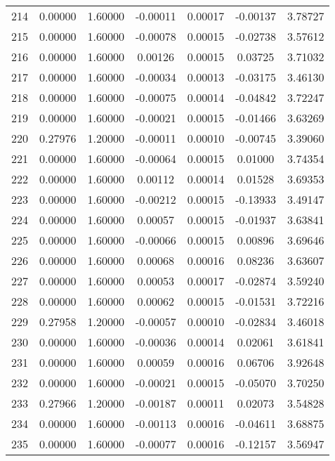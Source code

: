 \begin{longtable}{c c c c c c c}
214 &  0.00000 &      1.60000 & -0.00011 &   0.00017 &  -0.00137 &   3.78727 \\
215 &  0.00000 &      1.60000 & -0.00078 &   0.00015 &  -0.02738 &   3.57612 \\
216 &  0.00000 &      1.60000 &  0.00126 &   0.00015 &   0.03725 &   3.71032 \\
217 &  0.00000 &      1.60000 & -0.00034 &   0.00013 &  -0.03175 &   3.46130 \\
218 &  0.00000 &      1.60000 & -0.00075 &   0.00014 &  -0.04842 &   3.72247 \\
219 &  0.00000 &      1.60000 & -0.00021 &   0.00015 &  -0.01466 &   3.63269 \\
220 &  0.27976 &      1.20000 & -0.00011 &   0.00010 &  -0.00745 &   3.39060 \\
221 &  0.00000 &      1.60000 & -0.00064 &   0.00015 &   0.01000 &   3.74354 \\
222 &  0.00000 &      1.60000 &  0.00112 &   0.00014 &   0.01528 &   3.69353 \\
223 &  0.00000 &      1.60000 & -0.00212 &   0.00015 &  -0.13933 &   3.49147 \\
224 &  0.00000 &      1.60000 &  0.00057 &   0.00015 &  -0.01937 &   3.63841 \\
225 &  0.00000 &      1.60000 & -0.00066 &   0.00015 &   0.00896 &   3.69646 \\
226 &  0.00000 &      1.60000 &  0.00068 &   0.00016 &   0.08236 &   3.63607 \\
227 &  0.00000 &      1.60000 &  0.00053 &   0.00017 &  -0.02874 &   3.59240 \\
228 &  0.00000 &      1.60000 &  0.00062 &   0.00015 &  -0.01531 &   3.72216 \\
229 &  0.27958 &      1.20000 & -0.00057 &   0.00010 &  -0.02834 &   3.46018 \\
230 &  0.00000 &      1.60000 & -0.00036 &   0.00014 &   0.02061 &   3.61841 \\
231 &  0.00000 &      1.60000 &  0.00059 &   0.00016 &   0.06706 &   3.92648 \\
232 &  0.00000 &      1.60000 & -0.00021 &   0.00015 &  -0.05070 &   3.70250 \\
233 &  0.27966 &      1.20000 & -0.00187 &   0.00011 &   0.02073 &   3.54828 \\
234 &  0.00000 &      1.60000 & -0.00113 &   0.00016 &  -0.04611 &   3.68875 \\
235 &  0.00000 &      1.60000 & -0.00077 &   0.00016 &  -0.12157 &   3.56947 \\

\end{longtable}
